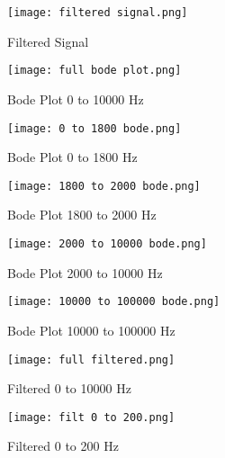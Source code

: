 \documentclass[11pt,a4]{report}
\begin{document}
\newpage

\begin{figure}[h!]
    \begin{center}
  \caption{Filtered Signal}
  \texttt{[image: filtered signal.png]}
\end{center}
\end{figure}

\begin{figure}[h!]
    \begin{center}
  \caption{Bode Plot 0 to 10000 Hz}
  \texttt{[image: full bode plot.png]}
\end{center}
\end{figure}

\begin{figure}[h!]
    \begin{center}
  \caption{Bode Plot 0 to 1800 Hz}
  \texttt{[image: 0 to 1800 bode.png]}
\end{center}
\end{figure}
\newpage


\begin{figure}[h!]
    \begin{center}
  \caption{Bode Plot 1800 to 2000 Hz}
  \texttt{[image: 1800 to 2000 bode.png]}
\end{center}
\end{figure}
\newpage

\begin{figure}[h!]
    \begin{center}
  \caption{Bode Plot 2000 to 10000 Hz}
  \texttt{[image: 2000 to 10000 bode.png]}
\end{center}
\end{figure}

\begin{figure}[h!]
    \begin{center}
  \caption{Bode Plot 10000 to 100000 Hz}
  \texttt{[image: 10000 to 100000 bode.png]}
\end{center}
\end{figure}

\newpage

\begin{figure}[h!]
    \begin{center}
  \caption{Filtered 0 to 10000 Hz}
  \texttt{[image: full filtered.png]}
\end{center}
\end{figure}

\begin{figure}[h!]
    \begin{center}
  \caption{Filtered 0 to 200 Hz}
  \texttt{[image: filt 0 to 200.png]}
\end{center}
\end{figure}
\end{document}
